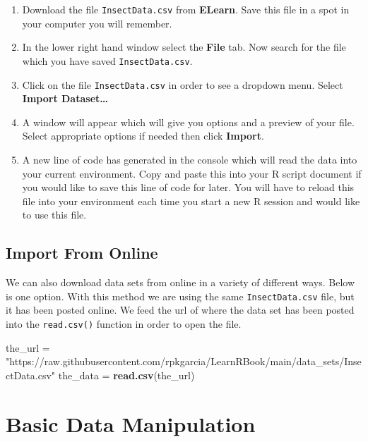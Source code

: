 \documentclass[
]{book}
\newenvironment{Shaded}{\begin{snugshade}}{\end{snugshade}}
\newcommand{\KeywordTok}[1]{\textcolor[rgb]{0.13,0.29,0.53}{\textbf{#1}}}
\newcommand{\NormalTok}[1]{#1}
\newcommand{\StringTok}[1]{\textcolor[rgb]{0.31,0.60,0.02}{#1}}
\begin{document}
\begin{enumerate}
\def\labelenumi{\arabic{enumi})}
\item
  Download the file \texttt{InsectData.csv} from \textbf{ELearn}. Save this file in a spot in your computer you will remember.
\item
  In the lower right hand window select the \textbf{File} tab. Now search for the file which you have saved \texttt{InsectData.csv}.
\item
  Click on the file \texttt{InsectData.csv} in order to see a dropdown menu. Select \textbf{Import Dataset\ldots{}}
\item
  A window will appear which will give you options and a preview of your file. Select appropriate options if needed then click \textbf{Import}.
\item
  A new line of code has generated in the console which will read the data into your current environment. Copy and paste this into your R script document if you would like to save this line of code for later. You will have to reload this file into your environment each time you start a new R session and would like to use this file.
\end{enumerate}

\hypertarget{import-from-online}{%
\subsection*{Import From Online}\label{import-from-online}}

We can also download data sets from online in a variety of different ways. Below is one option. With this method we are using the same \texttt{InsectData.csv} file, but it has been posted online. We feed the url of where the data set has been posted into the \texttt{read.csv()} function in order to open the file.

\begin{Shaded}
\begin{Highlighting}[]
\NormalTok{the_url =}\StringTok{ "https://raw.githubusercontent.com/rpkgarcia/LearnRBook/main/data_sets/InsectData.csv"}
\NormalTok{the_data =}\StringTok{ }\KeywordTok{read.csv}\NormalTok{(the_url)}
\end{Highlighting}
\end{Shaded}

\hypertarget{basic-data-manipulation}{%
\section{Basic Data Manipulation}\label{basic-data-manipulation}}
\end{document}
